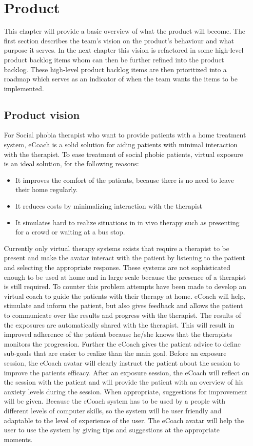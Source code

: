 \chapter{Product}
This chapter will provide a basic overview of what the product will become. The first section describes the team's vision on the product's behaviour and what purpose it serves. In the next chapter this vision is refactored in some high-level product backlog items whom can then be further refined into the product backlog. These high-level product backlog items are then prioritized into a roadmap which serves as an indicator of when the team wants the items to be implemented.

\section{Product vision}
For Social phobia therapist who want to provide patients with a home treatment system, \gls{eCoach} is a  solid solution for aiding patients with minimal interaction with the therapist. To ease treatment of social phobic patients, virtual exposure is an ideal solution, for the following reasons:
\begin{itemize}
\item It improves the comfort of the patients, because there is no need to leave their home regularly.
\item It reduces costs by minimalizing interaction with the therapist
\item It simulates hard to realize situations in in vivo therapy such as presenting for a crowd or waiting at a bus stop.
\end{itemize}
Currently only virtual therapy systems exists that require a therapist to be present and make the \gls{avatar} interact with the patient by listening to the patient and selecting the appropriate response. These systems are not sophisticated enough to be used at home and in large scale because the presence of a therapist is still required. To counter this problem attempts have been made to develop an virtual coach to guide the patients with their therapy at home.
\gls{eCoach} will help, stimulate and inform the patient, but also gives feedback and allows the patient to communicate over the results and progress with the therapist. The results of the exposures are automatically shared with the therapist. This will result in improved adherence of the patient because he/she knows that the therapists monitors the progression.
Further the \gls{eCoach} gives the patient advice to define sub-goals that are easier to realize than the main goal. Before an exposure session, the \gls{eCoach} \gls{avatar} will clearly instruct the patient about the session to improve the patients efficacy. After an exposure session, the \gls{eCoach} will reflect on the session with the patient and will provide the patient with an overview of his anxiety levels during the session. When appropriate, suggestions for improvement will be given.
Because the \gls{eCoach} system has to be used by a people with different levels of computer skills, so the system will be user friendly and adaptable to the level of experience of the user. The \gls{eCoach} \gls{avatar} will help the user to use the system by giving tips and suggestions at the appropriate moments.


